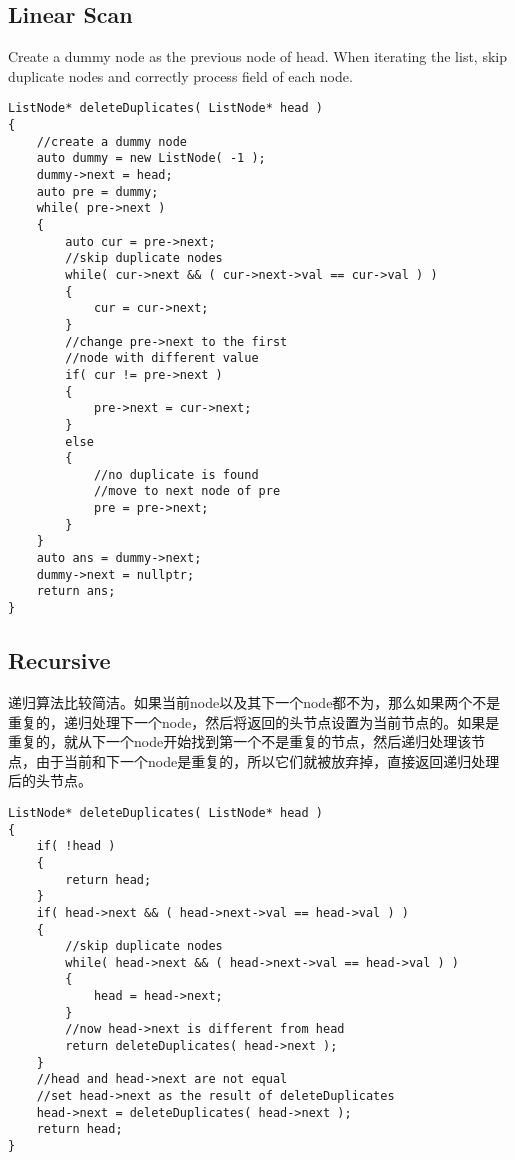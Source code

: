 \subsection{Linear Scan}
Create a dummy node as the previous node of head. When iterating the list, skip duplicate nodes and correctly process  field of each node.

\setcounter{lstlisting}{0}
\begin{lstlisting}[style=customc, caption={Iterative}]
ListNode* deleteDuplicates( ListNode* head )
{
    //create a dummy node
    auto dummy = new ListNode( -1 );
    dummy->next = head;
    auto pre = dummy;
    while( pre->next )
    {
        auto cur = pre->next;
        //skip duplicate nodes
        while( cur->next && ( cur->next->val == cur->val ) )
        {
            cur = cur->next;
        }
        //change pre->next to the first
        //node with different value
        if( cur != pre->next )
        {
            pre->next = cur->next;
        }
        else
        {
            //no duplicate is found
            //move to next node of pre
            pre = pre->next;
        }
    }
    auto ans = dummy->next;
    dummy->next = nullptr;
    return ans;
}
\end{lstlisting}

\subsection{Recursive}
递归算法比较简洁。如果当前node以及其下一个node都不为，那么如果两个不是重复的，递归处理下一个node，然后将返回的头节点设置为当前节点的。如果是重复的，就从下一个node开始找到第一个不是重复的节点，然后递归处理该节点，由于当前和下一个node是重复的，所以它们就被放弃掉，直接返回递归处理后的头节点。

\begin{lstlisting}[style=customc, caption={Recursive}]
ListNode* deleteDuplicates( ListNode* head )
{
    if( !head )
    {
        return head;
    }
    if( head->next && ( head->next->val == head->val ) )
    {
        //skip duplicate nodes
        while( head->next && ( head->next->val == head->val ) )
        {
            head = head->next;
        }
        //now head->next is different from head
        return deleteDuplicates( head->next );
    }
    //head and head->next are not equal
    //set head->next as the result of deleteDuplicates
    head->next = deleteDuplicates( head->next );
    return head;
}
\end{lstlisting}
